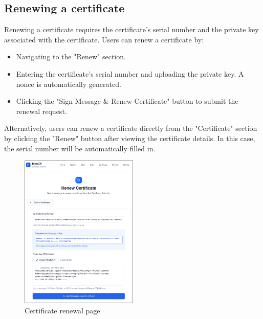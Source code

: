 \subsection{Renewing a certificate}
Renewing a certificate requires the certificate's serial number and the 
private key associated with the certificate. Users can renew a certificate by:
\begin{itemize}
    \item Navigating to the "Renew" section.
    \item Entering the certificate's serial number and uploading the private key. A 
            nonce is automatically generated.
    \item Clicking the "Sign Message \& Renew Certificate" button to submit the renewal request.
\end{itemize}
Alternatively, users can renew a certificate directly from the "Certificate" section by 
clicking the "Renew" button after viewing the certificate details.
In this case, the serial number will be automatically filled in.
\begin{figure}[h!]
    \centering
    \includegraphics[keepaspectratio, width=0.5\textwidth]{Pic/6_renew_certificate.png}
    \caption{Certificate renewal page}
    \label{fig:certificate-renew}
\end{figure}
